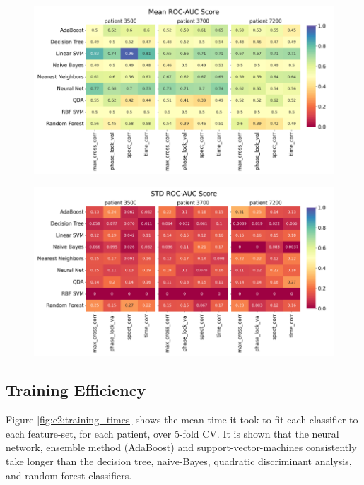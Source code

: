 \begin{figure}[!htb]
    \centering
    \includegraphics[width=\textwidth]{c2Deterministic/Figs/PSP/mean_roc_auc_classifiers_and_features.png}
    \label{fig:c2:mean_roc_auc}

    \centering
    \includegraphics[width=\textwidth]{c2Deterministic/Figs/PSP/std_roc_auc_classifiers_and_features.png}
    \label{fig:c2:std_roc_auc}
\end{figure}


\subsection{Training Efficiency}
Figure \ref{fig:c2:training_times} shows the mean time it took to fit each classifier to each feature-set, for each patient, over 5-fold CV. It is shown that the neural network, ensemble method (AdaBoost) and support-vector-machines consistently take longer than the decision tree, naive-Bayes, quadratic discriminant analysis, and random forest classifiers.

